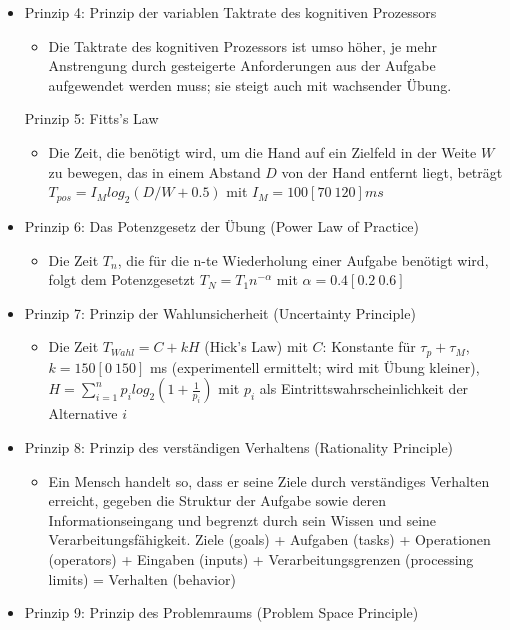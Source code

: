 \documentclass[paper=a4, fontsize=11pt]{scrartcl} %
\numberwithin{equation}{section} %
\numberwithin{figure}{section} %
\numberwithin{table}{section} %
\begin{document}
\begin{itemize}
\begin{itemize}
\end{itemize}
\item Prinzip 4: Prinzip der variablen Taktrate des kognitiven Prozessors
\begin{itemize}
\item Die Taktrate des kognitiven Prozessors ist umso höher, je mehr Anstrengung durch gesteigerte Anforderungen aus der Aufgabe aufgewendet werden muss; sie steigt auch mit wachsender Übung.
\end{itemize}
Prinzip 5: Fitts's Law
\begin{itemize}
\item Die Zeit, die benötigt wird, um die Hand auf ein Zielfeld in der Weite $W$ zu bewegen, das in einem Abstand $D$ von der Hand entfernt liegt, beträgt $T_{pos} = I_M log_2 (D/W + 0.5)$ mit $I_M = 100 [70 ~ 120] ms$
\end{itemize}
\item Prinzip 6: Das Potenzgesetz der Übung (Power Law of Practice)
\begin{itemize}
\item Die Zeit $T_n$, die für die n-te Wiederholung einer Aufgabe benötigt wird, folgt dem Potenzgesetzt $T_N = T_1 n^{-\alpha}$ mit $\alpha = 0.4 [0.2 ~ 0.6]$
\end{itemize}
\item Prinzip 7: Prinzip der Wahlunsicherheit (Uncertainty Principle)
\begin{itemize}
\item Die Zeit $T_{Wahl} = C + kH$ (Hick's Law) mit $C$: Konstante für $\tau_p + \tau_M$, $k = 150 [0 ~150]$ ms (experimentell ermittelt; wird mit Übung kleiner), $H = \sum_{i=1}^n p_i log_2 (1+\frac{1}{p_i})$ mit $p_i$ als Eintrittswahrscheinlichkeit der Alternative $i$
\end{itemize}
\item Prinzip 8: Prinzip des verständigen Verhaltens (Rationality Principle)
\begin{itemize}
\item Ein Mensch handelt so, dass er seine Ziele durch verständiges Verhalten erreicht, gegeben die Struktur der Aufgabe sowie deren Informationseingang und begrenzt durch sein Wissen und seine Verarbeitungsfähigkeit. Ziele (goals) + Aufgaben (tasks) + Operationen (operators) + Eingaben (inputs) + Verarbeitungsgrenzen (processing limits) = Verhalten (behavior)
\end{itemize}
\item Prinzip 9: Prinzip des Problemraums (Problem Space Principle)
\begin{itemize}

\end{itemize}
\end{itemize}
\end{document}
